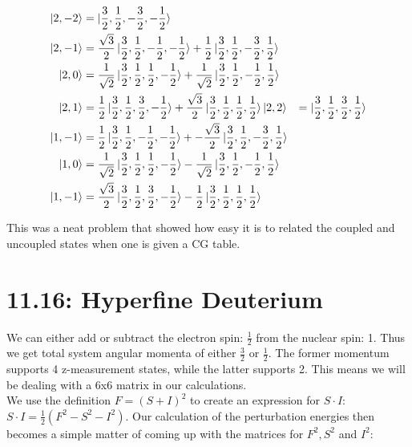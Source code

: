 \documentclass[10pt]{article} %
\begin{document}
\begin{align*}
  \ket{2,-2} &= \ket{\frac{3}{2},\frac{1}{2},-\frac{3}{2}, -\frac{1}{2}}\\
  \ket{2,-1} &=
  \frac{\sqrt{3}}{2}\ket{\frac{3}{2},\frac{1}{2},-\frac{1}{2},-\frac{1}{2}}
  + \frac{1}{2}\ket{\frac{3}{2},\frac{1}{2},-\frac{3}{2},\frac{1}{2}}\\
  \ket{2,0} &=
  \frac{1}{\sqrt{2}}\ket{\frac{3}{2},\frac{1}{2},\frac{1}{2},-\frac{1}{2}}
  + \frac{1}{\sqrt{2}}\ket{\frac{3}{2},\frac{1}{2},-\frac{1}{2},\frac{1}{2}}\\
  \ket{2,1} &=
  \frac{1}{2}\ket{\frac{3}{2},\frac{1}{2},\frac{3}{2},-\frac{1}{2}}
  + \frac{\sqrt{3}}{2}\ket{\frac{3}{2},\frac{1}{2},\frac{1}{2},\frac{1}{2}}
  \ket{2,2} &= \ket{\frac{3}{2},\frac{1}{2},\frac{3}{2},\frac{1}{2}}\\
  \ket{1,-1} &=
  \frac{1}{2}\ket{\frac{3}{2},\frac{1}{2},-\frac{1}{2},-\frac{1}{2}}
  + -\frac{\sqrt{3}}{2}\ket{\frac{3}{2},\frac{1}{2},-\frac{3}{2},\frac{1}{2}}\\
  \ket{1,0} &=
  \frac{1}{\sqrt{2}}\ket{\frac{3}{2},\frac{1}{2},\frac{1}{2},-\frac{1}{2}}
    - \frac{1}{\sqrt{2}}\ket{\frac{3}{2},\frac{1}{2},-\frac{1}{2},\frac{1}{2}}\\
  \ket{1,-1} &=
  \frac{\sqrt{3}}{2}\ket{\frac{3}{2},\frac{1}{2},\frac{3}{2},-\frac{1}{2}}
  - \frac{1}{2} \ket{\frac{3}{2},\frac{1}{2},\frac{1}{2},\frac{1}{2}}\\
\end{align*}

This was a neat problem that showed how easy it is to related the coupled and
uncoupled states when one is given a CG table.\\

\section{11.16: Hyperfine Deuterium}
We can either add or subtract the electron spin: $\frac{1}{2}$ from the nuclear
spin: 1. Thus we get total system angular momenta of either $\frac{3}{2}$ or
$\frac{1}{2}$. The former momentum supports 4 z-measurement states, while the latter
supports 2. This means we will be dealing with a 6x6 matrix in our calculations.\\

We use the definition $F = \left(S+I\right)^2$ to create an expression for $S\cdot I$:
$S\cdot I = \frac{1}{2}\left(F^2 - S^2 - I^2\right)$. Our calculation of the
perturbation energies then becomes a simple matter of coming up with the matrices for
$F^2, S^2$ and $I^2$:\\
\end{document}
